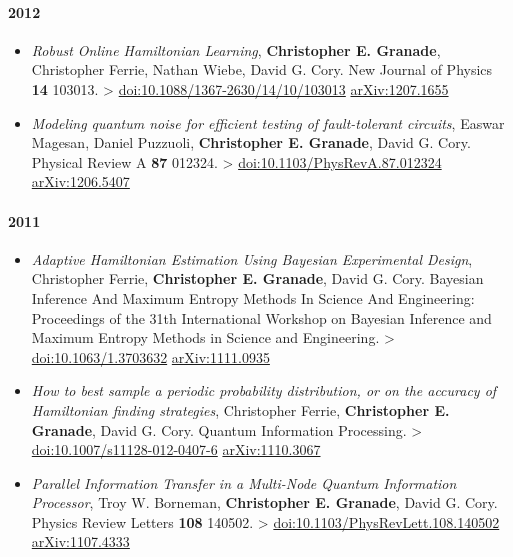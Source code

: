 \documentclass[]{article}
\begin{document}
\paragraph{2012}\label{section-2}

\begin{itemize}
\item
  \emph{Robust Online Hamiltonian Learning}, \textbf{Christopher E.
  Granade}, Christopher Ferrie, Nathan Wiebe, David G. Cory. New Journal
  of Physics \textbf{14} 103013. \textgreater{}
  \href{http://dx.doi.org/10.1088/1367-2630/14/10/103013}{doi:10.1088/1367-2630/14/10/103013}
  \textbar{} \href{http://arxiv.org/abs/1207.1655}{arXiv:1207.1655}
\item
  \emph{Modeling quantum noise for efficient testing of fault-tolerant
  circuits}, Easwar Magesan, Daniel Puzzuoli, \textbf{Christopher E.
  Granade}, David G. Cory. Physical Review A \textbf{87} 012324.
  \textgreater{}
  \href{http://dx.doi.org/10.1103/PhysRevA.87.012324}{doi:10.1103/PhysRevA.87.012324}
  \textbar{} \href{http://arxiv.org/abs/1206.5407}{arXiv:1206.5407}
\end{itemize}

\paragraph{2011}\label{section-3}

\begin{itemize}
\item
  \emph{Adaptive Hamiltonian Estimation Using Bayesian Experimental
  Design}, Christopher Ferrie, \textbf{Christopher E. Granade}, David G.
  Cory. Bayesian Inference And Maximum Entropy Methods In Science And
  Engineering: Proceedings of the 31th International Workshop on
  Bayesian Inference and Maximum Entropy Methods in Science and
  Engineering. \textgreater{}
  \href{http://dx.doi.org/10.1063/1.3703632}{doi:10.1063/1.3703632}
  \textbar{} \href{http://arxiv.org/abs/1111.0935}{arXiv:1111.0935}
\item
  \emph{How to best sample a periodic probability distribution, or on
  the accuracy of Hamiltonian finding strategies}, Christopher Ferrie,
  \textbf{Christopher E. Granade}, David G. Cory. Quantum Information
  Processing. \textgreater{}
  \href{http://dx.doi.org/10.1007/s11128-012-0407-6}{doi:10.1007/s11128-012-0407-6}
  \textbar{} \href{http://arxiv.org/abs/1110.3067}{arXiv:1110.3067}
\item
  \emph{Parallel Information Transfer in a Multi-Node Quantum
  Information Processor}, Troy W. Borneman, \textbf{Christopher E.
  Granade}, David G. Cory. Physics Review Letters \textbf{108} 140502.
  \textgreater{}
  \href{http://dx.doi.org/10.1103/PhysRevLett.108.140502}{doi:10.1103/PhysRevLett.108.140502}
  \textbar{} \href{http://arxiv.org/abs/1107.4333}{arXiv:1107.4333}
\end{itemize}
\end{document}
